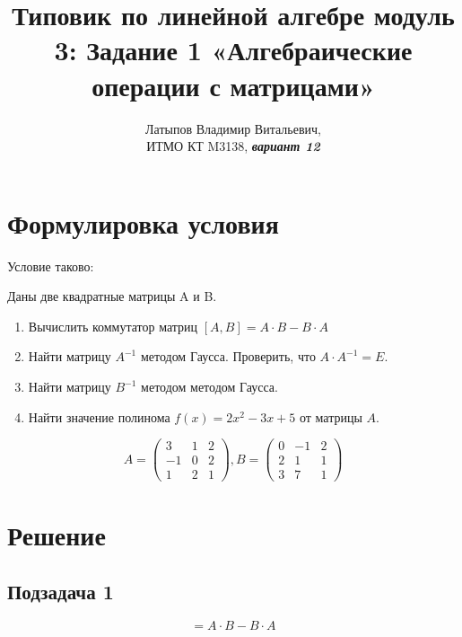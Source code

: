 \documentclass[12pt, a4paper]{article}
\author{Латыпов Владимир Витальевич, \\ ИТМО КТ M3138, \Huge{\textit{\textbf{вариант 12}}}}
\title{Типовик по линейной алгебре модуль 3: Задание 1 «Алгебраические операции с матрицами»}
\begin{document}
    \tit

    \section{Формулировка условия}

    \begin{statement}
        Условие таково: 
        
        Даны две квадратные матрицы A и B.
        \begin{enumerate}
            \item Вычислить коммутатор матриц $[A, B] = A · B − B · A$
            \item Найти матрицу $A^{−1}$ методом Гаусса. Проверить, что $A \cdot A^{-1} = E$.
            \item Найти матрицу $B^{−1}$ методом методом Гаусса.
            \item Найти значение полинома $f(x) = 2x^2 − 3x + 5$ от матрицы $A$. 
        \end{enumerate}
        
        \begin{equation}
            A = \begin{pmatrix}
                3 & 1 & 2 \\
                −1 & 0 & 2 \\
                1 & 2 & 1
            \end{pmatrix}, B = \begin{pmatrix}
                0 & −1 & 2 \\
                2 & 1 & 1 \\
                3 & 7 & 1
            \end{pmatrix}
        \end{equation}
            
    \end{statement}

    \section{Решение}

    \subsection{Подзадача 1}
    
    \begin{equation}
        [A, B] = A · B − B · A
    \end{equation}
\end{document}
